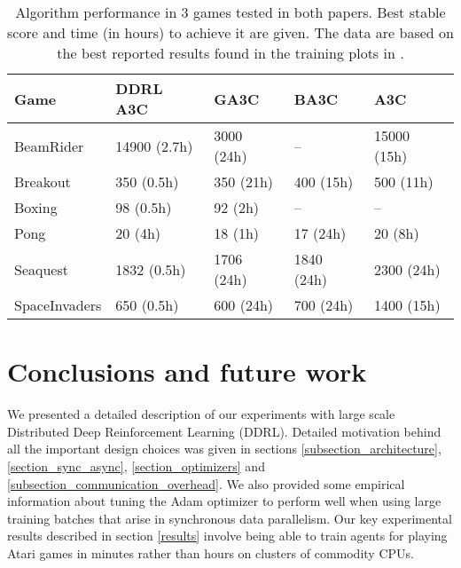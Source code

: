 \documentclass{llncs}
\begin{document}
\renewcommand*{\arraystretch}{1.3}
\begin{table}[h]
\centering
\begin{minipage}[c]{0.2\textwidth}
\caption{Algorithm performance in 3 games tested in both papers. Best stable score and time (in hours) to achieve it are given. The data are based on the best reported results found in the training plots in \cite{ga3c_2017,ba3c_paper,deepmind_a3c}.}
\label{ga3c_comparison}
\end{minipage}
\hfill
\begin{minipage}[c]{0.78\textwidth}
\begin{tabular}{ |p{2.3cm}|p{1.8cm}|p{1.5cm}|p{1.5cm}|p{1.7cm}| }
\hline
Game & DDRL A3C& GA3C \cite{ga3c_2017} & BA3C \cite{ba3c_paper} & A3C \cite{deepmind_a3c}\\\hline
BeamRider & 14900 (2.7h) & 3000 (24h)& -- & 15000 (15h) \\
Breakout & 350 (0.5h) & 350 (21h) & 400 (15h) & 500 (11h)\\
Boxing & 98 (0.5h) & 92 (2h) & -- & --\\
Pong & 20 (4h) & 18 (1h) & 17 (24h) & 20 (8h)\\
Seaquest & 1832 (0.5h) & 1706 (24h) & 1840 (24h) & 2300 (24h)\\
SpaceInvaders & 650 (0.5h) & 600 (24h) & 700 (24h) & 1400 (15h)\\\hline
\end{tabular}
\end{minipage}
\end{table}





 \section{Conclusions and future work}

We presented a detailed description of our experiments 	 with large scale Distributed Deep Reinforcement Learning (DDRL). Detailed motivation behind all the important design choices was given in sections \ref{subsection_architecture}, \ref{section_sync_async}, \ref{section_optimizers} and \ref{subsection_communication_overhead}. We also provided some empirical information about tuning the Adam optimizer to perform well when using large training batches that arise in synchronous data parallelism. Our key experimental results described in section \ref{results} involve being able to train agents for playing Atari games in minutes rather than hours on clusters of commodity CPUs.
\end{document}
